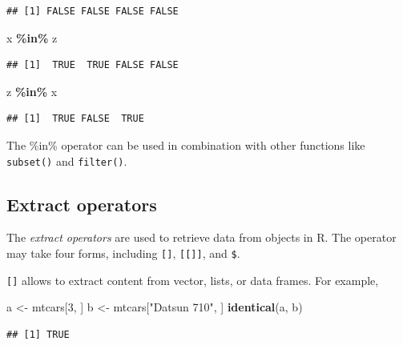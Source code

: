 \documentclass[
  12pt,
  oneside]{book}
\newenvironment{Shaded}{\begin{snugshade}}{\end{snugshade}}
\newcommand{\DecValTok}[1]{\textcolor[rgb]{0.00,0.00,0.81}{#1}}
\newcommand{\FunctionTok}[1]{\textcolor[rgb]{0.13,0.29,0.53}{\textbf{#1}}}
\newcommand{\NormalTok}[1]{#1}
\newcommand{\OtherTok}[1]{\textcolor[rgb]{0.56,0.35,0.01}{#1}}
\newcommand{\SpecialCharTok}[1]{\textcolor[rgb]{0.81,0.36,0.00}{\textbf{#1}}}
\newcommand{\StringTok}[1]{\textcolor[rgb]{0.31,0.60,0.02}{#1}}
\begin{document}
\begin{verbatim}
## [1] FALSE FALSE FALSE FALSE
\end{verbatim}

\begin{Shaded}
\begin{Highlighting}[]
\NormalTok{x }\SpecialCharTok{\%in\%}\NormalTok{ z  }
\end{Highlighting}
\end{Shaded}

\begin{verbatim}
## [1]  TRUE  TRUE FALSE FALSE
\end{verbatim}

\begin{Shaded}
\begin{Highlighting}[]
\NormalTok{z }\SpecialCharTok{\%in\%}\NormalTok{ x}
\end{Highlighting}
\end{Shaded}

\begin{verbatim}
## [1]  TRUE FALSE  TRUE
\end{verbatim}

The \%in\% operator can be used in combination with other functions like \texttt{subset()} and \texttt{filter()}.

\hypertarget{extract-operators}{%
\subsection{Extract operators}\label{extract-operators}}

The \emph{extract operators} are used to retrieve data from objects in R. The operator may take four forms, including \texttt{{[}{]}}, \texttt{{[}{[}{]}{]}}, and \texttt{\$}.

\texttt{{[}{]}} allows to extract content from vector, lists, or data frames. For example,

\begin{Shaded}
\begin{Highlighting}[]
\NormalTok{a }\OtherTok{\textless{}{-}}\NormalTok{ mtcars[}\DecValTok{3}\NormalTok{, ]}
\NormalTok{b }\OtherTok{\textless{}{-}}\NormalTok{ mtcars[}\StringTok{"Datsun 710"}\NormalTok{, ]}
\FunctionTok{identical}\NormalTok{(a, b)}
\end{Highlighting}
\end{Shaded}

\begin{verbatim}
## [1] TRUE
\end{verbatim}
\end{document}
